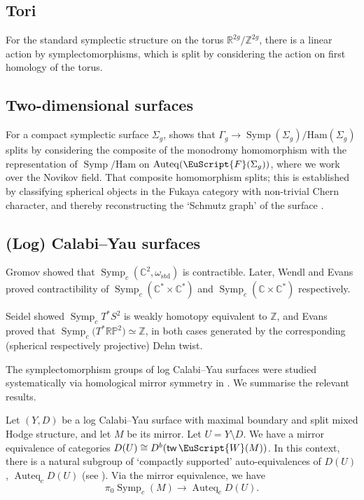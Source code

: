 \documentclass[pdftex]{sigma}
\DeclareMathOperator{\Auteq}{Auteq}
\newcommand{\std}{\mathrm{std}}
\newcommand{\scrF}{\EuScript{F}}
\def\scrW{\EuScript{W}}
\DeclareMathOperator{\Symp}{Symp}
\def\bP{\mathbb{P}}
\def\bZ{\mathbb{Z}}
\def\bC{\mathbb{C}}
\def\bR{\mathbb{R}}
\theoremstyle{definition}
\DeclareMathOperator{\tw}{\mathsf{tw}}
\numberwithin{equation}{section}
\begin{document}
\subsection{Tori}

For the standard symplectic structure on the torus $\bR^{2g}/\bZ^{2g}$, there is a linear action by symplectomorphisms, which is split by considering the action on first homology of the torus.


\subsection{Two-dimensional surfaces}

For a compact symplectic surface $\Sigma_g$, \cite{Auroux-Smith} shows that $\Gamma_g\to \Symp(\Sigma_g) / \mathrm{Ham}(\Sigma_g)$ splits by considering the composite of the monodromy homomorphism with the representation of $\Symp / \mathrm{Ham}$ on $\Auteq(\scrF(\Sigma_g))$, where we work over the Novikov field. That composite homomorphism splits; this is established by classifying spherical objects in the Fukaya category with non-trivial Chern character, and thereby reconstructing the `Schmutz graph' of the surface \cite{Schmutz}.

\subsection{(Log) Calabi--Yau surfaces}

Gromov \cite{Gromov-1985} showed that $\Symp_c(\bC^2, \omega_\std)$ is contractible. Later, Wendl \cite{Wendl} and Evans \cite{Evans} proved contractibility of $\Symp_c(\bC^* \times \bC^*)$ and $\Symp_c(\bC\times\bC^*)$ respectively.

Seidel \cite{Seidel_T*S2_unpublished, Seidel_lectures_4Dtwists} showed $\Symp_c T^\ast S^2$ is weakly homotopy equivalent to $\bZ$, and Evans \cite{Evans} proved that $\Symp_c\bigl(T^*\bR\bP^2\bigr) \simeq \bZ$, in both cases generated by the corresponding (spherical respectively projective) Dehn twist.

The symplectomorphism groups of log Calabi--Yau surfaces were studied systematically via homological mirror symmetry in \cite{Hacking-Keating-1,Hacking-Keating-2}. We summarise the relevant results.

Let $(Y, D)$ be a log Calabi--Yau surface with maximal boundary and split mixed Hodge structure, and let $M$ be its mirror. Let $U = Y \setminus D$. We have a mirror equivalence of categories $D(U) \cong D^b (\tw \scrW (M))$.
In this context, there is a natural subgroup of `compactly supported' auto-equivalences of $D(U)$, $\Auteq_c D(U)$ (see \cite[Definition~2.16]{Hacking-Keating-2}). Via the mirror equivalence, we have
\begin{equation*}
\pi_0 \Symp_c (M) \longrightarrow \Auteq_c D(U).
\end{equation*}
\end{document}
